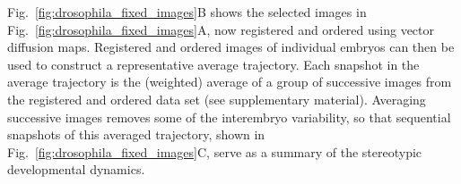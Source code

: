 \documentclass[twocolumn, 10pt]{article}
\newcommand{\SI}[0]{supplementary material}
\newcommand{\fig}[0]{Fig.}
\begin{document}
\fig~\ref{fig:drosophila_fixed_images}B shows the selected images in \fig~\ref{fig:drosophila_fixed_images}A, now registered and ordered using vector diffusion maps.
%
Registered and ordered images of individual embryos can then be used to construct a representative average trajectory. 
%
%
%
Each snapshot in the average trajectory is the (weighted) average of a group of successive images from the registered and ordered data set (see \SI).
%
Averaging successive images removes some of the interembryo variability, so that sequential snapshots of this averaged trajectory, shown in \fig~\ref{fig:drosophila_fixed_images}C, serve as a summary of the stereotypic developmental dynamics.
\end{document}
